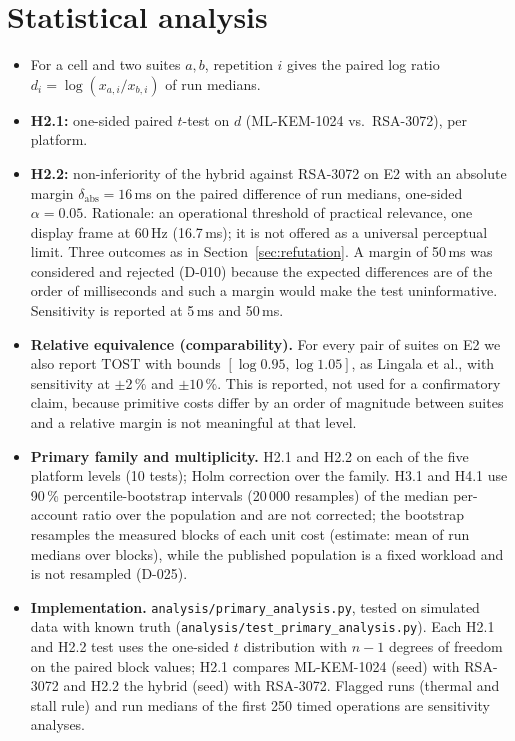 \documentclass[11pt,a4paper]{article}
\begin{document}
\section{Statistical analysis}\label{sec:analysis}
\begin{itemize}
\item For a cell and two suites $a,b$, repetition $i$ gives the paired log ratio $d_i = \log(x_{a,i}/x_{b,i})$ of run medians.
\item \textbf{H2.1:} one-sided paired $t$-test on $d$ (ML-KEM-1024 vs.\ RSA-3072), per platform.
\item \textbf{H2.2:} non-inferiority of the hybrid against RSA-3072 on E2 with an absolute margin $\delta_{\mathrm{abs}} = 16$\,ms on the paired difference of run medians, one-sided $\alpha = 0.05$. Rationale: an operational threshold of practical relevance, one display frame at 60\,Hz (16.7\,ms); it is not offered as a universal perceptual limit. Three outcomes as in Section~\ref{sec:refutation}. A margin of 50\,ms was considered and rejected (D-010) because the expected differences are of the order of milliseconds and such a margin would make the test uninformative. Sensitivity is reported at 5\,ms and 50\,ms.
\item \textbf{Relative equivalence (comparability).} For every pair of suites on E2 we also report TOST with bounds $[\log 0.95, \log 1.05]$, as Lingala et al., with sensitivity at $\pm2\,\%$ and $\pm10\,\%$. This is reported, not used for a confirmatory claim, because primitive costs differ by an order of magnitude between suites and a relative margin is not meaningful at that level.
\item \textbf{Primary family and multiplicity.} H2.1 and H2.2 on each of the five platform levels (10 tests); Holm correction over the family. H3.1 and H4.1 use 90\,\% percentile-bootstrap intervals (20\,000 resamples) of the median per-account ratio over the population and are not corrected; the bootstrap resamples the measured blocks of each unit cost (estimate: mean of run medians over blocks), while the published population is a fixed workload and is not resampled (D-025).
\item \textbf{Implementation.} \texttt{analysis/\allowbreak{}primary\_\allowbreak{}analysis.py}, tested on simulated data with known truth (\texttt{analysis/\allowbreak{}test\_\allowbreak{}primary\_\allowbreak{}analysis.py}). Each H2.1 and H2.2 test uses the one-sided $t$ distribution with $n-1$ degrees of freedom on the paired block values; H2.1 compares ML-KEM-1024 (seed) with RSA-3072 and H2.2 the hybrid (seed) with RSA-3072. Flagged runs (thermal and stall rule) and run medians of the first 250 timed operations are sensitivity analyses.

\end{itemize}
\end{document}

